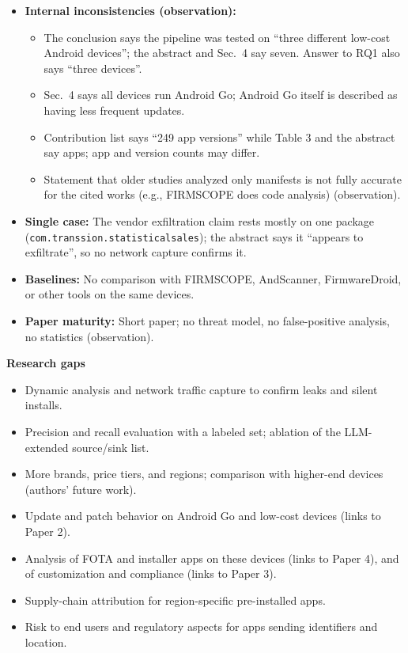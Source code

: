 \documentclass[11pt,a4paper]{article}
\begin{document}
\begin{enumerate}
\begin{itemize}[leftmargin=*,itemsep=1pt,topsep=2pt]
        \item \textbf{Internal inconsistencies (observation):}
        \begin{itemize}[itemsep=0pt]
            \item The conclusion says the pipeline was tested on ``three different low-cost Android devices''; the abstract and Sec.~4 say seven. Answer to RQ1 also says ``three devices''.
            \item Sec.~4 says all devices run Android Go; Android Go itself is described as having less frequent updates.
            \item Contribution list says ``249 app versions'' while Table 3 and the abstract say apps; app and version counts may differ.
            \item Statement that older studies analyzed only manifests is not fully accurate for the cited works (e.g., FIRMSCOPE does code analysis) (observation).
        \end{itemize}
        \item \textbf{Single case:} The vendor exfiltration claim rests mostly on one package (\texttt{com.transsion.statisticalsales}); the abstract says it ``appears to exfiltrate'', so no network capture confirms it.
        \item \textbf{Baselines:} No comparison with FIRMSCOPE, AndScanner, FirmwareDroid, or other tools on the same devices.
        \item \textbf{Paper maturity:} Short paper; no threat model, no false-positive analysis, no statistics (observation).
    \end{itemize}

    \vspace{4pt}
    \textbf{Research gaps}
    \begin{itemize}[leftmargin=*,itemsep=1pt,topsep=2pt]
        \item Dynamic analysis and network traffic capture to confirm leaks and silent installs.
        \item Precision and recall evaluation with a labeled set; ablation of the LLM-extended source/sink list.
        \item More brands, price tiers, and regions; comparison with higher-end devices (authors' future work).
        \item Update and patch behavior on Android Go and low-cost devices (links to Paper 2).
        \item Analysis of FOTA and installer apps on these devices (links to Paper 4), and of customization and compliance (links to Paper 3).
        \item Supply-chain attribution for region-specific pre-installed apps.
        \item Risk to end users and regulatory aspects for apps sending identifiers and location.
    \end{itemize}

\end{enumerate}
\end{document}
